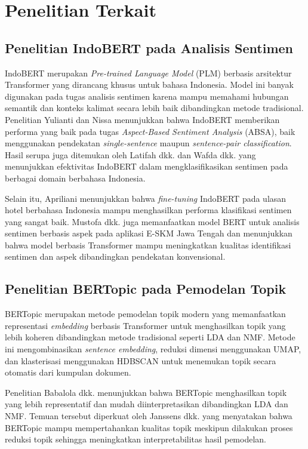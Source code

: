 \section{Penelitian Terkait}

\subsection{Penelitian IndoBERT pada Analisis Sentimen}

IndoBERT merupakan \textit{Pre-trained Language Model} (PLM) berbasis arsitektur Transformer yang dirancang khusus untuk bahasa Indonesia. Model ini banyak digunakan pada tugas analisis sentimen karena mampu memahami hubungan semantik dan konteks kalimat secara lebih baik dibandingkan metode tradisional. Penelitian Yulianti dan Nissa \cite{yulianti2023} menunjukkan bahwa IndoBERT memberikan performa yang baik pada tugas \textit{Aspect-Based Sentiment Analysis} (ABSA), baik menggunakan pendekatan \textit{single-sentence} maupun \textit{sentence-pair classification}. Hasil serupa juga ditemukan oleh Latifah dkk. \cite{latifah2024} dan Wafda dkk. \cite{wafda2025} yang menunjukkan efektivitas IndoBERT dalam mengklasifikasikan sentimen pada berbagai domain berbahasa Indonesia.

Selain itu, Apriliani \cite{apriliani2025} menunjukkan bahwa \textit{fine-tuning} IndoBERT pada ulasan hotel berbahasa Indonesia mampu menghasilkan performa klasifikasi sentimen yang sangat baik. Mustofa dkk. \cite{mustofa2026} juga memanfaatkan model BERT untuk analisis sentimen berbasis aspek pada aplikasi E-SKM Jawa Tengah dan menunjukkan bahwa model berbasis Transformer mampu meningkatkan kualitas identifikasi sentimen dan aspek dibandingkan pendekatan konvensional.

\subsection{Penelitian BERTopic pada Pemodelan Topik}

BERTopic merupakan metode pemodelan topik modern yang memanfaatkan representasi \textit{embedding} berbasis Transformer untuk menghasilkan topik yang lebih koheren dibandingkan metode tradisional seperti LDA dan NMF. Metode ini mengombinasikan \textit{sentence embedding}, reduksi dimensi menggunakan UMAP, dan klasterisasi menggunakan HDBSCAN untuk menemukan topik secara otomatis dari kumpulan dokumen.

Penelitian Babalola dkk. \cite{babalola2023} menunjukkan bahwa BERTopic menghasilkan topik yang lebih representatif dan mudah diinterpretasikan dibandingkan LDA dan NMF. Temuan tersebut diperkuat oleh Janssens dkk. \cite{janssens2025} yang menyatakan bahwa BERTopic mampu mempertahankan kualitas topik meskipun dilakukan proses reduksi topik sehingga meningkatkan interpretabilitas hasil pemodelan.

